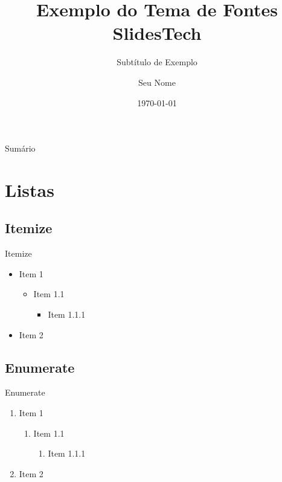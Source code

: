 \documentclass[aspect ratio = 169]{beamer}
\title{Exemplo do Tema de Fontes SlidesTech}
\subtitle{Subtítulo de Exemplo}
\author{Seu Nome}
\institute{Sua Instituição}
\date{\today}
\begin{document}
\maketitle %

\begin{frame}{Sumário}

\tableofcontents
    
\end{frame}

\section{Listas}

\subsection{Itemize}
\begin{frame}{Itemize}
\begin{itemize}
    \item Item 1
    \begin{itemize}
        \item Item 1.1
        \begin{itemize}
            \item Item 1.1.1
        \end{itemize}
    \end{itemize}
    \item Item 2
\end{itemize}
\end{frame}

\subsection{Enumerate}
\begin{frame}{Enumerate}
\begin{enumerate}
    \item Item 1
    \begin{enumerate}
        \item Item 1.1
        \begin{enumerate}
            \item Item 1.1.1
        \end{enumerate}
    \end{enumerate}
    \item Item 2
\end{enumerate}
\end{frame}
\end{document}
